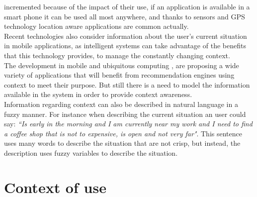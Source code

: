 incremented because of the impact of their use, if an application 
is available in a smart phone it can be used all most anywhere, 
and thanks to sensors and GPS technology location aware 
applications are common actually.\\ 
Recent technologies also consider information about the user's 
current situation in mobile applications, as intelligent systems 
can take advantage of the benefits that this technology provides, 
to manage the constantly changing context. \\ 
The development in mobile and ubiquitous 
computing \cite{noguera2012mobile} \cite{chiou2010adaptive}, are 
proposing a wide variety of applications that will benefit 
from recommendation engines using context to meet their
purpose. But still there is a need to model the information 
available in the system in order to provide context awareness.\\  
Information regarding context can also be described in natural 
language in a fuzzy manner. For instance when describing 
the current situation an user could say: \textit{``Is early in
the morning and I am currently near my work and I need to 
find a coffee shop that is not to expensive, is open 
and not very far"}. This sentence uses many words to describe 
the situation that are not crisp, but instead, the description 
uses fuzzy variables to describe the situation.  

\section{Context of use}\label{contextofuse}

